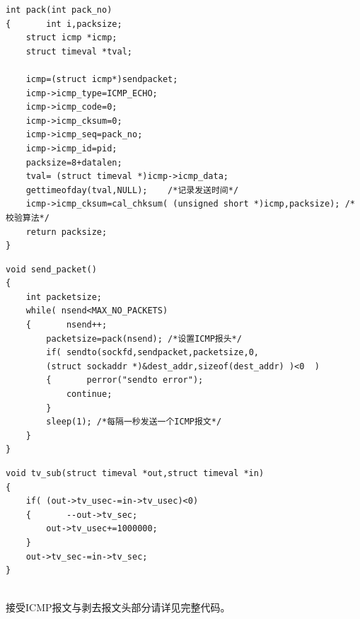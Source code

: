 \documentclass[UTF8]{ctexart}
\begin{document}
\par{
\begin{lstlisting}
int pack(int pack_no)
{       int i,packsize;
	struct icmp *icmp;
	struct timeval *tval;
	
	icmp=(struct icmp*)sendpacket;
	icmp->icmp_type=ICMP_ECHO;
	icmp->icmp_code=0;
	icmp->icmp_cksum=0;
	icmp->icmp_seq=pack_no;
	icmp->icmp_id=pid;
	packsize=8+datalen;
	tval= (struct timeval *)icmp->icmp_data;
	gettimeofday(tval,NULL);    /*记录发送时间*/
	icmp->icmp_cksum=cal_chksum( (unsigned short *)icmp,packsize); /*校验算法*/
	return packsize;
}

\end{lstlisting}
}

\par{
\begin{lstlisting}
void send_packet()
{       
	int packetsize;
	while( nsend<MAX_NO_PACKETS)
	{       nsend++;
		packetsize=pack(nsend); /*设置ICMP报头*/
		if( sendto(sockfd,sendpacket,packetsize,0,
		(struct sockaddr *)&dest_addr,sizeof(dest_addr) )<0  )
		{       perror("sendto error");
			continue;
		}
		sleep(1); /*每隔一秒发送一个ICMP报文*/
	}
}
\end{lstlisting}
}

\par{
\begin{lstlisting}
void tv_sub(struct timeval *out,struct timeval *in)
{       
	if( (out->tv_usec-=in->tv_usec)<0)
	{       --out->tv_sec;
		out->tv_usec+=1000000;
	}
	out->tv_sec-=in->tv_sec;
}
	
\end{lstlisting}
}
\par{接受ICMP报文与剥去报文头部分请详见完整代码。}
\end{document}
